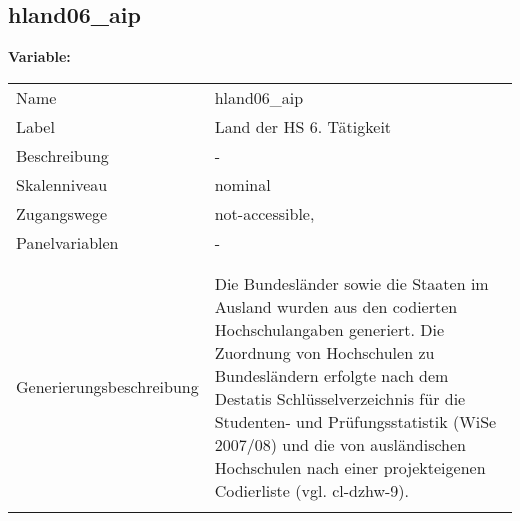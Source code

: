 	
	
	\subsection{hland06\_aip}
	\label{subSection:hland06_aip}

	\noindent\textbf{Variable:}\\
		\begin{tabular}{lL{11.3cm}}
			\label{tableVariable:hland06_aip}
			Name & hland06\_aip \\
			Label & Land der HS 6. Tätigkeit \\
			Beschreibung & - \\
			Skalenniveau & nominal \\
			Zugangswege &
				not-accessible,
 \\
			Panelvariablen & -
			 \\
			 \\
 \\
					Generierungsbeschreibung & Die Bundesländer sowie die Staaten im Ausland wurden aus den codierten Hochschulangaben generiert. Die Zuordnung von Hochschulen zu Bundesländern erfolgte nach dem Destatis Schlüsselverzeichnis für die Studenten- und Prüfungsstatistik (WiSe 2007/08) und die von ausländischen Hochschulen nach einer projekteigenen Codierliste (vgl. cl-dzhw-9).
				 \\	
			 \\
		\end{tabular}






	
	\newpage
